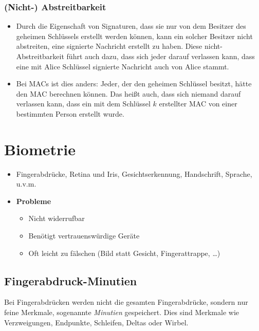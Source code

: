 			\subsubsection{(Nicht-) Abstreitbarkeit}
				\begin{itemize}
					\item Durch die Eigenschaft von Signaturen, dass sie nur von dem Besitzer des geheimen Schlüssels erstellt werden können, kann ein solcher Besitzer nicht abstreiten, eine signierte Nachricht erstellt zu haben. Diese nicht-Abstreitbarkeit führt auch dazu, dass sich jeder darauf verlassen kann, dass eine mit Alice Schlüssel signierte Nachricht auch von Alice stammt.
					\item Bei MACs ist dies anders: Jeder, der den geheimen Schlüssel besitzt, hätte den MAC berechnen können. Das heißt auch, dass sich niemand darauf verlassen kann, dass ein mit dem Schlüssel \(k\) erstellter MAC von einer bestimmten Person erstellt wurde.
				\end{itemize}

	\section{Biometrie}
		\begin{itemize}
			\item Fingerabdrücke, Retina und Iris, Gesichtserkennung, Handschrift, Sprache, u.v.m.
			\item \textbf{Probleme}
				\begin{itemize}
					\item Nicht widerrufbar
					\item Benötigt vertrauenswürdige Geräte
					\item Oft leicht zu fälschen (Bild statt Gesicht, Fingerattrappe, \dots)
				\end{itemize}
		\end{itemize}

		\subsection{Fingerabdruck-Minutien}
			Bei Fingerabdrücken werden nicht die gesamten Fingerabdrücke, sondern nur feine Merkmale, sogenannte \textit{Minutien} gespeichert. Dies sind Merkmale wie Verzweigungen, Endpunkte, Schleifen, Deltas oder Wirbel.

